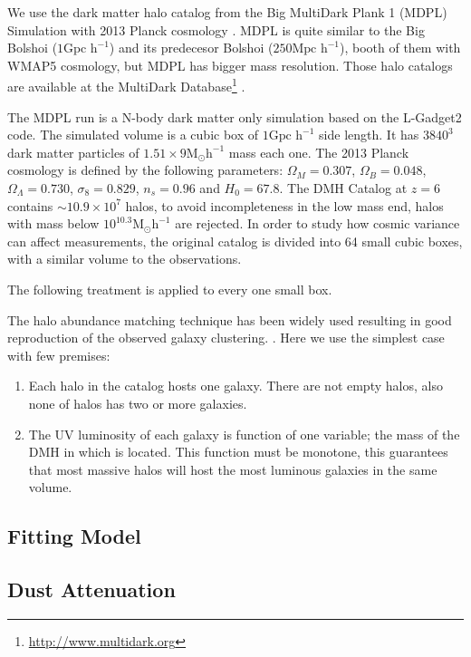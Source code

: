 \documentclass{emulateapj}
\begin{document}
We use the dark matter halo catalog from the Big MultiDark Plank 1 (MDPL) 
Simulation \citep{Klypin14} with 2013 Planck cosmology \citep{Planck1}. MDPL is 
quite similar to the Big Bolshoi ($1 \textrm{Gpc h}^{-1}$) \citep{Prada12} and 
its predecesor Bolshoi \citep{Klypin11} ($250 \textrm{Mpc h}^{-1}$), booth of 
them with WMAP5 cosmology, but MDPL has bigger mass resolution.  Those halo 
catalogs are available at the MultiDark 
Database\footnote{\url{http://www.multidark.org}} \citep{Riebe13}.

The MDPL run is a N-body dark matter only simulation based on the L-Gadget2 
code. The simulated volume is a cubic box of $1 \textrm{Gpc h}^{-1}$ side 
length. It has $3840^3$ dark matter particles of  $1.51\times 9
\textrm{M}_{\odot} \textrm{h}^{-1}$ mass each one. The 2013 Planck
cosmology is defined by the following parameters: $\Omega_M = 0.307$,
$\Omega_B = 0.048$, $\Omega_\Lambda = 0.730$, $\sigma_8 = 0.829$, $n_s
= 0.96$ and  $H_0 = 67.8$. The DMH Catalog at $z=6$ contains $\sim
10.9 \times 10^7$   halos, to avoid incompleteness in the low mass
end, halos with mass below   $10^{10.3} \textrm{M}_{\odot}
\textrm{h}^{-1}$ are rejected. In order to study how  
cosmic variance can affect measurements, the original catalog is
divided into 64 small   cubic boxes, with a similar volume to the
observations. 

The following treatment is applied to every one small box.

The halo abundance matching technique has been widely used \citep{Colin99, 
Kravtsov04} resulting in good reproduction of the observed galaxy clustering. 
\citep{Conroy06, Lee09}. Here we use the simplest case with few premises: 
\begin{enumerate}
 \item Each halo in the catalog hosts one galaxy. There are not empty
halos, also none of halos has two or more galaxies.
 \item The UV luminosity of each galaxy is function of one variable; the mass of
the DMH in which is located. This function must be monotone, this guarantees that most 
massive halos will host the most luminous galaxies in the same volume.
\end{enumerate}

\subsection{Fitting Model}



\subsection{Dust Attenuation}
 
\end{document}
